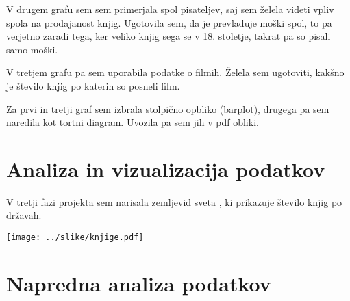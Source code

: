\documentclass[11pt,a4paper]{article}
\begin{document}
V drugem grafu sem sem primerjala spol pisateljev, saj sem želela videti vpliv spola na prodajanost knjig. Ugotovila sem, da je prevladuje moški spol, to pa verjetno zaradi tega, ker veliko knjig sega se v 18. stoletje, takrat pa so pisali samo moški. 

V tretjem grafu pa sem uporabila podatke o filmih. Želela sem ugotoviti, kakšno je število knjig po katerih so posneli film. 

Za prvi in tretji graf sem izbrala stolpično opbliko (barplot), drugega pa sem naredila kot tortni diagram. Uvozila pa sem jih v pdf obliki. 





\section{Analiza in vizualizacija podatkov}


V tretji fazi projekta sem narisala zemljevid sveta , ki prikazuje število knjig po državah.
 
\texttt{[image: ../slike/knjige.pdf]}



\section{Napredna analiza podatkov}
\end{document}

